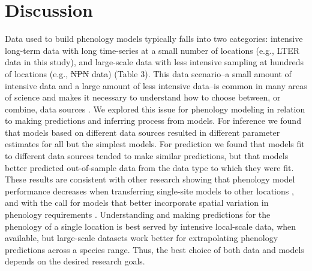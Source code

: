 \documentclass[fleqn,12pt,lineno]{article}
\providecommand{\DIFadd}[1]{{\protect\color{blue}\uwave{#1}}} %
\providecommand{\DIFdel}[1]{{\protect\color{red}\sout{#1}}}                      %
\providecommand{\DIFaddbegin}{} %
\providecommand{\DIFaddend}{} %
\providecommand{\DIFdelbegin}{} %
\providecommand{\DIFdelend}{} %
\begin{document}
\section*{Discussion}

Data used to build phenology models typically falls into two categories: intensive long-term data with long time-series at a small number of locations (e.g., LTER data in this study), and large-scale data with less intensive sampling at hundreds of locations (e.g., \DIFdelbegin \DIFdel{NPN }\DIFdelend \DIFaddbegin \DIFadd{USA-NPN }\DIFaddend data) (Table 3). This data scenario--a small amount of intensive data and a large amount of less intensive data--is common in many areas of science and makes it necessary to understand how to choose between, or combine, data sources \citep{hanks2018}. We explored this issue for phenology modeling in relation to making predictions and inferring process from models. For inference we found that models based on different data sources resulted in different parameter estimates for all but the simplest models. For prediction we found that models fit to different data sources tended to make similar predictions, but that models better predicted out-of-sample data from the data type to which they were fit. These results are consistent with other research showing that phenology model performance decreases when transferring single-site models to other locations \citep{garcia-mozo2008, xu2013, basler2016}, and with the call for models that better incorporate spatial variation in phenology requirements \citep{richardson2013, chuine2017}. Understanding and making predictions for the phenology of a single location is best served by intensive local-scale data, when available, but large-scale datasets work better for extrapolating phenology predictions across a species range. Thus, the best choice of both data and models depends on the desired research goals.
\end{document}
